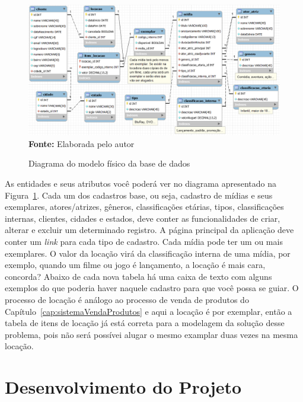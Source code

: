 \FloatBarrier
\begin{figure}[!htbp]
    \centering
    \caption{Diagrama do modelo físico da base de dados}
    \includegraphics[scale=0.45]{imagens/cap09ModeloFisico}
    \\\textbf{Fonte:} Elaborada pelo autor
    \label{fig:cap09ModeloFisico}
\end{figure}
\FloatBarrier

As entidades e seus atributos você poderá ver no diagrama apresentado na Figura~\ref{fig:cap09ModeloFisico}. Cada um dos cadastros base, ou seja, cadastro de mídias e seus exemplares, atores/atrizes, gêneros, classificações etárias, tipos, classificações internas, clientes, cidades e estados, deve conter as funcionalidades de criar, alterar e excluir um determinado registro. A página principal da aplicação deve conter um \textit{link} para cada tipo de cadastro. Cada mídia pode ter um ou mais exemplares. O valor da locação virá da classificação interna de uma mídia, por exemplo, quando um filme ou jogo é lançamento, a locação é mais cara, concorda? Abaixo de cada nova tabela há uma caixa de texto com alguns exemplos do que poderia haver naquele cadastro para que você possa se guiar. O processo de locação é análogo ao processo de venda de produtos do Capítulo~\ref{cap:sistemaVendaProdutos} e aqui a locação é por exemplar, então a tabela de itens de locação já está correta para a modelagem da solução desse problema, pois não será possívei alugar o mesmo examplar duas vezes na mesma locação.


\section{Desenvolvimento do Projeto}

